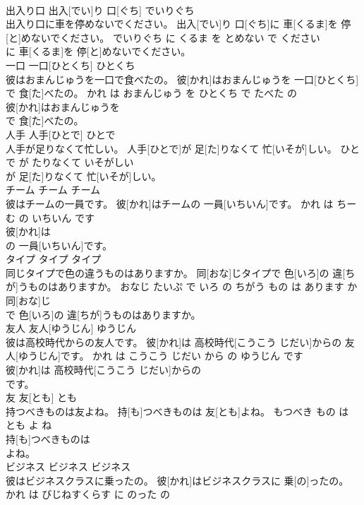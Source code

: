 \documentclass[8pt]{extreport}
\begin{document}
\begin{CJK}{UTF8}{min}
\\	出入り口	出入[でい]り 口[ぐち]	でいりぐち	
\\	出入り口に車を停めないでください。	出入[でい]り 口[ぐち]に 車[くるま]を 停[と]めないでください。	でいりぐち に くるま を とめない で ください	
\\	に 車[くるま]を 停[と]めないでください。			
\\	一口	一口[ひとくち]	ひとくち	
\\	彼はおまんじゅうを一口で食べたの。	彼[かれ]はおまんじゅうを 一口[ひとくち]で 食[た]べたの。	かれ は おまんじゅう を ひとくち で たべた の	
\\	彼[かれ]はおまんじゅうを
\\	で 食[た]べたの。			
\\	人手	人手[ひとで]	ひとで	
\\	人手が足りなくて忙しい。	人手[ひとで]が 足[た]りなくて 忙[いそが]しい。	ひとで が たりなくて いそがしい	
\\	が 足[た]りなくて 忙[いそが]しい。			
\\	チーム	チーム	チーム	
\\	彼はチームの一員です。	彼[かれ]はチームの 一員[いちいん]です。	かれ は ちーむ の いちいん です	
\\	彼[かれ]は
\\	の 一員[いちいん]です。			
\\	タイプ	タイプ	タイプ	
\\	同じタイプで色の違うものはありますか。	同[おな]じタイプで 色[いろ]の 違[ちが]うものはありますか。	おなじ たいぷ で いろ の ちがう もの は あります か	
\\	同[おな]じ
\\	で 色[いろ]の 違[ちが]うものはありますか。			
\\	友人	友人[ゆうじん]	ゆうじん	
\\	彼は高校時代からの友人です。	彼[かれ]は 高校時代[こうこう じだい]からの 友人[ゆうじん]です。	かれ は こうこう じだい から の ゆうじん です	
\\	彼[かれ]は 高校時代[こうこう じだい]からの
\\	です。			
\\	友	友[とも]	とも	
\\	持つべきものは友よね。	持[も]つべきものは 友[とも]よね。	もつべき もの は とも よ ね	
\\	持[も]つべきものは
\\	よね。			
\\	ビジネス	ビジネス	ビジネス	
\\	彼はビジネスクラスに乗ったの。	彼[かれ]はビジネスクラスに 乗[の]ったの。	かれ は びじねすくらす に のった の	

\end{CJK}
\end{document}

